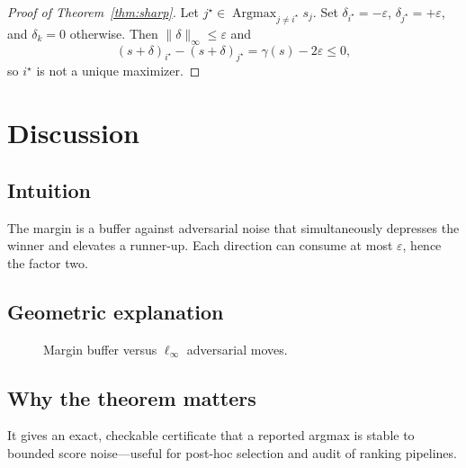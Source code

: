 \documentclass[11pt]{article}
\begin{document}
\begin{proof}[Proof of Theorem~\ref{thm:sharp}]
Let \(j^\star\in\operatorname*{Argmax}_{j\neq i^\star}s_j\).
Set \(\delta_{i^\star}=-\varepsilon\), \(\delta_{j^\star}=+\varepsilon\), and
\(\delta_k=0\) otherwise.
Then \(\|\delta\|_\infty\le\varepsilon\) and
\[
(s+\delta)_{i^\star}-(s+\delta)_{j^\star}=\gamma(s)-2\varepsilon\le 0,
\]
so \(i^\star\) is not a unique maximizer.
\end{proof}

\section{Discussion}
\subsection{Intuition}
The margin is a buffer against adversarial noise that simultaneously depresses
the winner and elevates a runner-up. Each direction can consume at most
\(\varepsilon\), hence the factor two.

\subsection{Geometric explanation}
\begin{figure}[h]
\centering
{}
\caption{Margin buffer versus \(\ell_\infty\) adversarial moves.}
\label{fig:margin}
\end{figure}

\subsection{Why the theorem matters}
It gives an exact, checkable certificate that a reported argmax is stable to
bounded score noise---useful for post-hoc selection and audit of ranking
pipelines.
\end{document}
